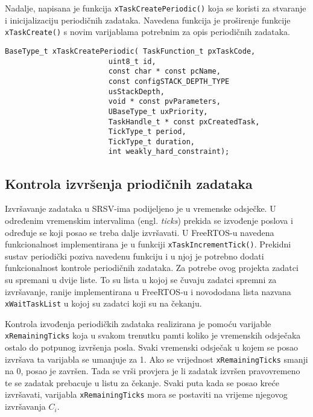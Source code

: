 \documentclass[../zavrsni.tex]{subfiles}
\begin{document}
Nadalje, napisana je funkcija \texttt{xTaskCreatePeriodic()} koja se koristi za stvaranje i inicijalizaciju periodičnih zadataka.
Navedena funkcija je proširenje funkcije \texttt{xTaskCreate()} s novim varijablama potrebnim za opis periodičnih zadataka.

\begin{lstlisting}[style=CStyle,caption={Prototip funkcije \texttt{xTaskCreatePeriodic()}},captionpos=b]
BaseType_t xTaskCreatePeriodic( TaskFunction_t pxTaskCode,
                        uint8_t id,
                        const char * const pcName, 
                        const configSTACK_DEPTH_TYPE 
                        usStackDepth,
                        void * const pvParameters,
                        UBaseType_t uxPriority,
                        TaskHandle_t * const pxCreatedTask,
                        TickType_t period,
                        TickType_t duration,
                        int weakly_hard_constraint);
\end{lstlisting} 

\subsection{Kontrola izvršenja priodičnih zadataka}

Izvršavanje zadataka u SRSV-ima podijeljeno je u vremenske odsječke. U određenim vremenskim intervalima (engl. \textit{ticks}) prekida se izvođenje poslova i 
određuje se koji posao se treba dalje izvršavati.
U FreeRTOS-u navedena funkcionalnost implementirana je u funkciji \texttt{xTaskIncrementTick()}. Prekidni sustav periodički poziva navedenu funkciju 
i u njoj je potrebno dodati funkcionalnost kontrole periodičnih zadataka.
Za potrebe ovog projekta zadatci su spremani u dvije liste. To su lista u kojoj se čuvaju zadatci spremni za izvršavanje, ranije 
implementirana u FreeRTOS-u i novododana lista nazvana \texttt{xWaitTaskList} u kojoj su zadatci koji su na čekanju. 

Kontrola izvođenja periodičkih zadataka realizirana je pomoću varijable \texttt{xRemainingTicks} koja u svakom trenutku pamti 
koliko je vremenskih odsječaka ostalo do potpunog izvršenja posla.
Svaki vremenski odsječak u kojem se posao izvršava ta varijabla se umanjuje za 1. Ako se vrijednost \texttt{xRemainingTicks} smanji na 0, 
posao je završen. Tada se vrši provjera je li zadatak izvršen pravovremeno te se zadatak prebacuje u listu za čekanje.
Svaki puta kada se posao kreće izvršavati, varijabla \texttt{xRemainingTicks} mora se postaviti na vrijeme njegovog izvršavanja $C_i$.
\end{document}
